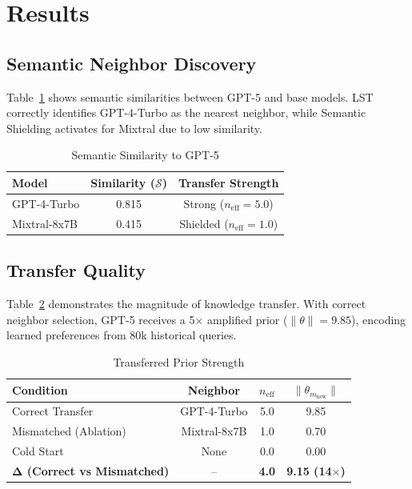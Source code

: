\documentclass[sigconf,nonacm]{acmart}
\begin{document}
\section{Results}

\subsection{Semantic Neighbor Discovery}

Table~\ref{tab:similarity} shows semantic similarities between GPT-5 and base models. LST correctly identifies GPT-4-Turbo as the nearest neighbor, while Semantic Shielding activates for Mixtral due to low similarity.

\begin{table}[h]
\centering
\caption{Semantic Similarity to GPT-5}
\label{tab:similarity}
\begin{tabular}{lcc}
\toprule
\textbf{Model} & \textbf{Similarity ($\mathcal{S}$)} & \textbf{Transfer Strength} \\
\midrule
GPT-4-Turbo & 0.815 & Strong ($n_{\text{eff}} = 5.0$) \\
Mixtral-8x7B & 0.415 & Shielded ($n_{\text{eff}} = 1.0$) \\
\bottomrule
\end{tabular}
\end{table}

\subsection{Transfer Quality}

Table~\ref{tab:transfer} demonstrates the magnitude of knowledge transfer. With correct neighbor selection, GPT-5 receives a 5$\times$ amplified prior ($\|\theta\| = 9.85$), encoding learned preferences from 80k historical queries.

\begin{table}[h]
\centering
\caption{Transferred Prior Strength}
\label{tab:transfer}
\begin{tabular}{lccc}
\toprule
\textbf{Condition} & \textbf{Neighbor} & \textbf{$n_{\text{eff}}$} & \textbf{$\|\theta_{m_{\text{new}}}\|$} \\
\midrule
Correct Transfer & GPT-4-Turbo & 5.0 & 9.85 \\
Mismatched (Ablation) & Mixtral-8x7B & 1.0 & 0.70 \\
Cold Start & None & 0.0 & 0.00 \\
\midrule
\textbf{Δ (Correct vs Mismatched)} & -- & \textbf{4.0} & \textbf{9.15 (14$\times$)} \\
\bottomrule
\end{tabular}
\end{table}
\end{document}
